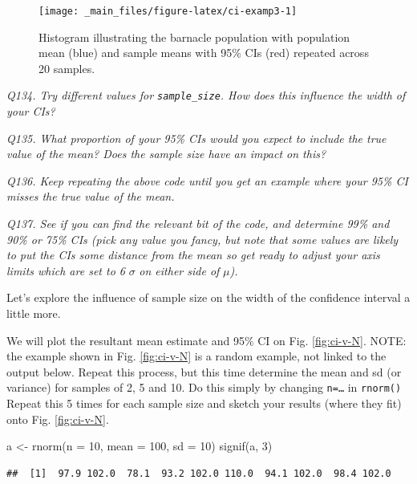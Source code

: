 \documentclass[
  11pt,
  a4paper,
]{book}
\newenvironment{Shaded}{\begin{snugshade}}{\end{snugshade}}
\newcommand{\AttributeTok}[1]{\textcolor[rgb]{0.77,0.63,0.00}{#1}}
\newcommand{\DecValTok}[1]{\textcolor[rgb]{0.00,0.00,0.81}{#1}}
\newcommand{\FunctionTok}[1]{\textcolor[rgb]{0.00,0.00,0.00}{#1}}
\newcommand{\NormalTok}[1]{#1}
\newcommand{\OtherTok}[1]{\textcolor[rgb]{0.56,0.35,0.01}{#1}}
\begin{document}
\begin{figure}

{\centering \texttt{[image: \_main\_files/figure-latex/ci-examp3-1]} 

}

\caption{Histogram illustrating the barnacle population with population mean (blue) and sample means with 95\% CIs (red) repeated across 20 samples.}\label{fig:ci-examp3}
\end{figure}

\emph{Q134. Try different values for \texttt{sample\_size}. How does this influence the width of your CIs?}

\emph{Q135. What proportion of your 95\% CIs would you expect to include the true value of the mean? Does the sample size have an impact on this?}

\emph{Q136. Keep repeating the above code until you get an example where your 95\% CI misses the true value of the mean.}

\emph{Q137. See if you can find the relevant bit of the code, and determine 99\% and 90\% or 75\% CIs (pick any value you fancy, but note that some values are likely to put the CIs some distance from the mean so get ready to adjust your axis limits which are set to 6} \(\sigma\) \emph{on either side of} \(\mu\)\emph{).}

Let's explore the influence of sample size on the width of the confidence interval a little more.

We will plot the resultant mean estimate and 95\% CI on Fig. \ref{fig:ci-v-N}. NOTE: the example shown in Fig. \ref{fig:ci-v-N} is a random example, not linked to the output below. Repeat this process, but this time determine the mean and sd (or variance) for samples of 2, 5 and 10. Do this simply by changing \texttt{n=…} in \texttt{rnorm()} Repeat this 5 times for each sample size and sketch your results (where they fit) onto Fig. \ref{fig:ci-v-N}.

\begin{Shaded}
\begin{Highlighting}[]
\NormalTok{a }\OtherTok{\textless{}{-}} \FunctionTok{rnorm}\NormalTok{(}\AttributeTok{n =} \DecValTok{10}\NormalTok{, }\AttributeTok{mean =} \DecValTok{100}\NormalTok{, }\AttributeTok{sd =} \DecValTok{10}\NormalTok{)}
\FunctionTok{signif}\NormalTok{(a, }\DecValTok{3}\NormalTok{)}
\end{Highlighting}
\end{Shaded}

\begin{verbatim}
##  [1]  97.9 102.0  78.1  93.2 102.0 110.0  94.1 102.0  98.4 102.0
\end{verbatim}
\end{document}
